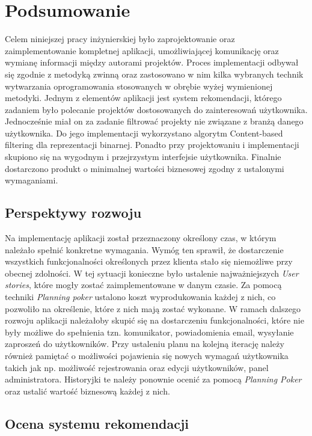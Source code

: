 \chapter{Podsumowanie}
Celem niniejszej pracy inżynierskiej było zaprojektowanie oraz zaimplementowanie kompletnej aplikacji, umożliwiającej komunikację oraz wymianę informacji między autorami projektów. Proces implementacji odbywał się zgodnie z metodyką zwinną oraz zastosowano w nim kilka wybranych technik wytwarzania oprogramowania stosowanych w obrębie wyżej wymienionej metodyki. Jednym z elementów aplikacji jest system rekomendacji, którego zadaniem było polecanie projektów dostosowanych do zainteresowań użytkownika. Jednocześnie miał on za zadanie filtrować projekty nie związane z branżą danego użytkownika. Do jego implementacji wykorzystano algorytm Content-based filtering dla reprezentacji binarnej. Ponadto przy projektowaniu i implementacji skupiono się na wygodnym i przejrzystym interfejsie użytkownika. Finalnie dostarczono produkt o minimalnej wartości biznesowej zgodny z ustalonymi wymaganiami.

\section{Perspektywy rozwoju}

Na implementację aplikacji został przeznaczony określony czas, w którym należało spełnić konkretne wymagania. Wymóg ten sprawił, że dostarczenie wszystkich funkcjonalności określonych przez klienta stało się niemożliwe przy obecnej zdolności. W tej sytuacji konieczne było ustalenie najważniejszych \textit{User stories}, które mogły zostać zaimplementowane w danym czasie. Za pomocą techniki \textit{Planning poker} ustalono koszt wyprodukowania każdej z nich, co pozwoliło na określenie, które z nich mają zostać wykonane. W ramach dalszego rozwoju aplikacji należałoby skupić się na dostarczeniu funkcjonalności, które nie były możliwe do spełnienia tzn. komunikator, powiadomienia email, wysyłanie zaproszeń do użytkowników. Przy ustaleniu planu na kolejną iterację należy również pamiętać o możliwości pojawienia się nowych wymagań użytkownika takich jak np. możliwość rejestrowania oraz edycji użytkowników, panel administratora. Historyjki te należy ponownie ocenić za pomocą \textit{Planning Poker} oraz ustalić wartość biznesową każdej z nich.

\section{Ocena systemu rekomendacji}

